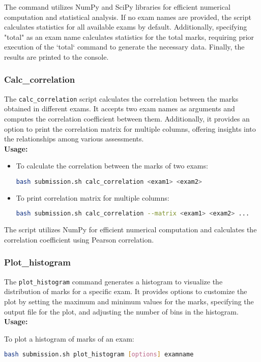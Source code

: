 \documentclass{article}
\begin{document}
The command utilizes NumPy and SciPy libraries for efficient numerical computation and statistical analysis. If no exam names are provided, the script calculates statistics for all available exams by default. Additionally, specifying "total" as an exam name calculates statistics for the total marks, requiring prior execution of the `total` command to generate the necessary data.  Finally, the results are printed to the console.

\subsubsection{Calc\_correlation}
The \texttt{calc\_correlation} script calculates the correlation between the marks obtained in different exams. It accepts two exam names as arguments and computes the correlation coefficient between them. Additionally, it provides an option to print the correlation matrix for multiple columns, offering insights into the relationships among various assessments.\\
\textbf{Usage:}
\begin{itemize}
    \item To calculate the correlation between the marks of two exams:
    \begin{lstlisting}[language=bash]
    bash submission.sh calc_correlation <exam1> <exam2>
    \end{lstlisting}
    \item To print correlation matrix for multiple columns:
    \begin{lstlisting}[language=bash]
    bash submission.sh calc_correlation --matrix <exam1> <exam2> ...
    \end{lstlisting}
\end{itemize}

The script utilizes NumPy for efficient numerical computation and calculates the correlation coefficient using Pearson correlation.

\subsubsection{Plot\_histogram}
The \texttt{plot\_histogram} command generates a histogram to visualize the distribution of marks for a specific exam. It provides options to customize the plot by setting the maximum and minimum values for the marks, specifying the output file for the plot, and adjusting the number of bins in the histogram.\\
\textbf{Usage:}
\begin{adjustwidth}{0.5cm}{0cm}
To plot a histogram of marks of an exam:
\begin{lstlisting}[language=bash]
bash submission.sh plot_histogram [options] examname
\end{lstlisting}
\end{adjustwidth}
\end{document}
